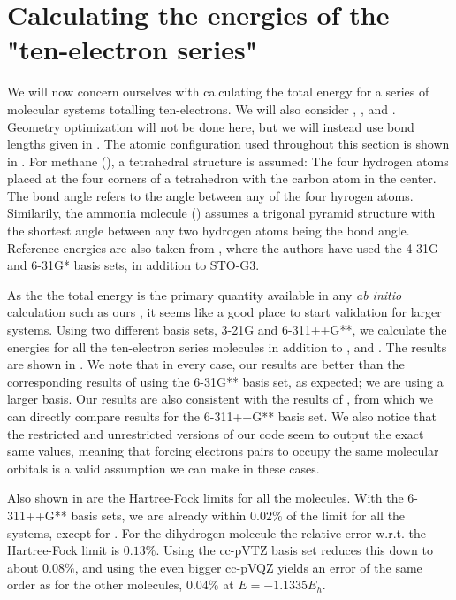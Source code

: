 \documentclass[../../master.tex]{subfiles}
\begin{document}
\section{Calculating the energies of the "ten-electron series"}
We will now concern ourselves with calculating the total energy for a series of molecular systems totalling ten-electrons. We will also consider , , and . Geometry optimization will not be done here, but we will instead use bond lengths given in \cite{szabo}. The atomic configuration used throughout this section is shown in . For methane (), a tetrahedral structure is assumed: The four hydrogen atoms placed at the four corners of a tetrahedron with the carbon atom in the center. The bond angle refers to the \textemdash{}\textemdash{} angle between any of the four hyrogen atoms. Similarily, the ammonia molecule () assumes a trigonal pyramid structure with the shortest \textemdash{}\textemdash{} angle between any two hydrogen atoms being the bond angle. Reference energies are also taken from \cite{szabo}, where the authors have used the 4-31G and 6-31G* basis sets, in addition to STO-G3. 

As the the total energy is the primary quantity available in any \emph{ab initio} calculation such as ours \cite{szabo}, it seems like a good place to start validation for larger systems. Using two different basis sets, 3-21G and 6-311++G**, we calculate the energies for all the ten-electron series molecules in addition to ,  and . The results are shown in . We note that in every case, our results are better than the corresponding results of \cite{szabo} using the 6-31G** basis set, as expected; we are using a larger basis. Our results are also consistent with the results of \cite{dragly}, from which we can directly compare results for the 6-311++G** basis set. We also notice that the restricted and unrestricted versions of our code seem to output the exact same values, meaning that forcing electrons pairs to occupy the same molecular orbitals is a valid assumption we can make in these cases.

Also shown in  are the Hartree-Fock limits for all the molecules. With the 6-311++G** basis sets, we are already within $0.02\%$ of the limit for all the systems, except for . For the dihydrogen molecule the relative error w.r.t. the Hartree-Fock limit is $0.13\%$. Using the cc-pVTZ basis set reduces this down to about $0.08\%$, and using the even bigger cc-pVQZ yields an error of the same order as for the other molecules, $0.04\%$ at $E=-1.1335E_h$.
\end{document}
